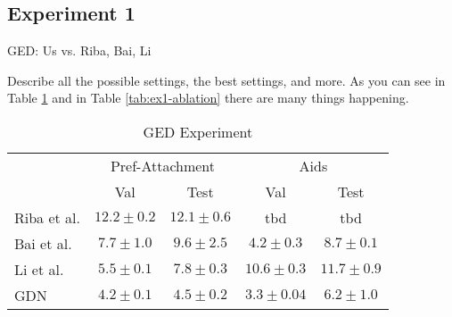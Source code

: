 \subsection{Experiment 1}

GED: Us vs. Riba, Bai, Li

Describe all the possible settings, the best settings, and more. As you can see in Table \ref{tab:ex1-baselines} and in Table \ref{tab:ex1-ablation} there are many things happening.


\begin{table}[htbp]
    \addtolength{\tabcolsep}{-1pt}
    \fontsize{9pt}{10.25pt}\selectfont
    \centering
    \renewcommand{\arraystretch}{1.2}
    \begin{tabular}{|l|c|c|c|c|}
        \hline
        \multirow{2}{*}{} & \multicolumn{2}{c|}{Pref-Attachment} & \multicolumn{2}{c|}{Aids} \\ \hhline{|~|-|-|-|-|}
        & Val & Test & Val & Test \\ \hhline{|=|=|=|=|=|}
        Riba et al. & $12.2 \pm 0.2$ & $12.1 \pm 0.6$ & tbd & tbd \\ \hline
        Bai et al. & $7.7 \pm 1.0$ & $9.6 \pm 2.5$ & $4.2 \pm 0.3$ & $8.7 \pm 0.1$ \\ \hline
        Li et al. & $5.5 \pm 0.1 $ & $7.8 \pm 0.3$ & $10.6 \pm 0.3$ & $11.7 \pm 0.9$ \\ \hline
        GDN & $4.2 \pm 0.1$ & $\boldsymbol{4.5 \pm 0.2}$ & $3.3 \pm 0.04$ & $\boldsymbol{6.2 \pm 1.0}$ \\ \hline
    \end{tabular}
    \caption{GED Experiment}
    \label{tab:ex1-baselines}
\end{table}


